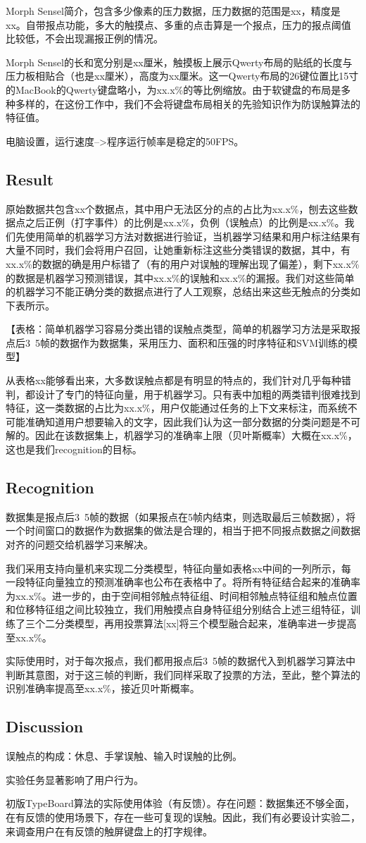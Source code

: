 Morph Sensel简介，包含多少像素的压力数据，压力数据的范围是xx，精度是xx。自带报点功能，多大的触摸点、多重的点击算是一个报点，压力的报点阈值比较低，不会出现漏报正例的情况。

Morph Sensel的长和宽分别是xx厘米，触摸板上展示Qwerty布局的贴纸的长度与压力板相贴合（也是xx厘米），高度为xx厘米。这一Qwerty布局的26键位置比15寸的MacBook的Qwerty键盘略小，为xx.x\%的等比例缩放。由于软键盘的布局是多种多样的，在这份工作中，我们不会将键盘布局相关的先验知识作为防误触算法的特征值。

电脑设置，运行速度-->程序运行帧率是稳定的50FPS。

\subsection{Result}

原始数据共包含xx个数据点，其中用户无法区分的点的占比为xx.x\%，刨去这些数据点之后正例（打字事件）的比例是xx.x\%，负例（误触点）的比例是xx.x\%。我们先使用简单的机器学习方法对数据进行验证，当机器学习结果和用户标注结果有大量不同时，我们会将用户召回，让她重新标注这些分类错误的数据，其中，有xx.x\%的数据的确是用户标错了（有的用户对误触的理解出现了偏差），剩下xx.x\%的数据是机器学习预测错误，其中xx.x\%的误触和xx.x\%的漏报。我们对这些简单的机器学习不能正确分类的数据点进行了人工观察，总结出来这些无触点的分类如下表所示。

【表格：简单机器学习容易分类出错的误触点类型，简单的机器学习方法是采取报点后3~5帧的数据作为数据集，采用压力、面积和压强的时序特征和SVM训练的模型】

从表格xx能够看出来，大多数误触点都是有明显的特点的，我们针对几乎每种错判，都设计了专门的特征向量，用于机器学习。只有表中加粗的两类错判很难找到特征，这一类数据的占比为xx.x\%，用户仅能通过任务的上下文来标注，而系统不可能准确知道用户想要输入的文字，因此我们认为这一部分数据的分类问题是不可解的。因此在该数据集上，机器学习的准确率上限（贝叶斯概率）大概在xx.x\%，这也是我们recognition的目标。

\subsection{Recognition}

数据集是报点后3~5帧的数据（如果报点在5帧内结束，则选取最后三帧数据），将一个时间窗口的数据作为数据集的做法是合理的，相当于把不同报点数据之间数据对齐的问题交给机器学习来解决。

我们采用支持向量机来实现二分类模型，特征向量如表格xx中间的一列所示，每一段特征向量独立的预测准确率也公布在表格中了。将所有特征结合起来的准确率为xx.x\%。进一步的，由于空间相邻触点特征组、时间相邻触点特征组和触点位置和位移特征组之间比较独立，我们用触摸点自身特征组分别结合上述三组特征，训练了三个二分类模型，再用投票算法[xx]将三个模型融合起来，准确率进一步提高至xx.x\%。

实际使用时，对于每次报点，我们都用报点后3~5帧的数据代入到机器学习算法中判断其意图，对于这三帧的判断，我们同样采取了投票的方法，至此，整个算法的识别准确率提高至xx.x\%，接近贝叶斯概率。

\subsection{Discussion}

误触点的构成：休息、手掌误触、输入时误触的比例。

实验任务显著影响了用户行为。

初版TypeBoard算法的实际使用体验（有反馈）。存在问题：数据集还不够全面，在有反馈的使用场景下，存在一些可复现的误触。因此，我们有必要设计实验二，来调查用户在有反馈的触屏键盘上的打字规律。
